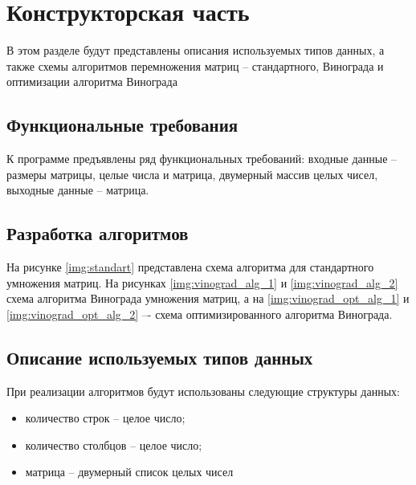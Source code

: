 \chapter{Конструкторская часть}

В этом разделе будут представлены описания используемых типов данных, а также схемы алгоритмов перемножения матриц – стандартного, Винограда и оптимизации алгоритма Винограда

\section{Функциональные требования}

К программе предъявлены ряд функциональных требований: входные данные -- размеры матрицы, целые числа и матрица, двумерный массив целых чисел, выходные данные -- матрица.

\section{Разработка алгоритмов}

На рисунке \ref{img:standart} представлена схема алгоритма для стандартного умножения матриц. На рисунках \ref{img:vinograd_alg_1} и \ref{img:vinograd_alg_2} схема алгоритма Винограда умножения матриц, а на \ref{img:vinograd_opt_alg_1} и \ref{img:vinograd_opt_alg_2} –- схема оптимизированного алгоритма Винограда.

\clearpage
{}
\clearpage
{}
\clearpage
{}
\clearpage
{}
\clearpage

\section{Описание используемых типов данных}

При реализации алгоритмов будут использованы следующие структуры данных:

\begin{itemize}
	\item количество строк -- целое число;
	\item количество столбцов -- целое число;
	\item матрица -- двумерный список целых чисел
\end{itemize}

